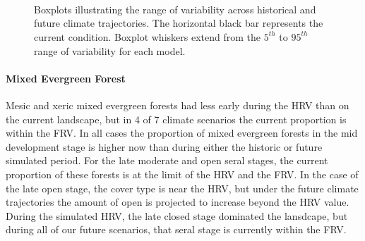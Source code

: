 \begin{figure}[htbp]
  \centering
   \\
   \\
    \\
    \caption{Boxplots illustrating the range of variability across historical and future climate trajectories. The horizontal black bar represents the current condition. Boxplot whiskers extend from the $5^{th}$ to $95^{th}$ range of variability for each model. }
  \label{fig:covcond_rfrx}
\end{figure} %

\paragraph{Mixed Evergreen Forest} Mesic and xeric mixed evergreen forests had less early during the HRV than on the current landscape, but in 4 of 7 climate scenarios the current proportion is within the FRV. In all cases the proportion of mixed evergreen forests in the mid development stage is higher now than during either the historic or future simulated period. For the late moderate and open seral stages, the current proportion of these forests is at the limit of the HRV and the FRV. In the case of the late open stage, the cover type is near the HRV, but under the future climate trajectories the amount of open is projected to increase beyond the HRV value. During the simulated HRV, the late closed stage dominated the lansdcape, but during all of our future scenarios, that seral stage is currently within the FRV. 

